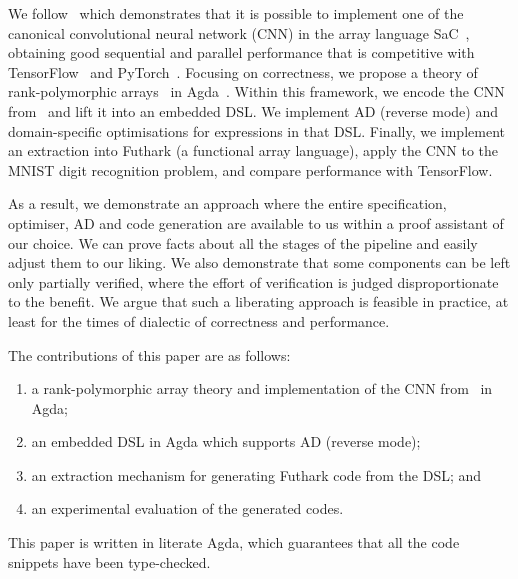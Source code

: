 We follow~\cite{cnn-array} which demonstrates that it is possible to implement
one of the canonical convolutional neural network (CNN) in the array language
SaC~\cite{sac1, sac2}, obtaining good sequential and parallel performance that
is competitive with TensorFlow~\cite{ad-tf} and PyTorch~\cite{ad-pytorch}.
Focusing on correctness, we propose a theory of rank-polymorphic
arrays~\cite{rank-poly} in Agda~\cite{agda-2-6-3}. Within this framework, we
encode the CNN from~\cite{cnn-array} and lift it into an embedded DSL. We
implement AD (reverse mode) and domain-specific optimisations for expressions in
that DSL. Finally, we implement an extraction into Futhark (a functional array
language), apply the CNN to the MNIST digit recognition problem, and compare
performance with TensorFlow.

As a result, we demonstrate an approach where the entire specification,
optimiser, AD and code generation are available to us within a proof assistant
of our choice. We can prove facts about all the stages of the pipeline and
easily adjust them to our liking. We also demonstrate that some components can
be left only partially verified, where the effort of verification is judged
disproportionate to the benefit. We argue that such a liberating approach is
feasible in practice, at least for the times of dialectic of correctness and
performance.

The contributions of this paper are as follows:
\begin{enumerate}
  \item a rank-polymorphic array theory and implementation of
        the CNN from~\cite{cnn-array} in Agda;
  \item an embedded DSL in Agda which supports AD (reverse mode);
  \item an extraction mechanism for generating Futhark code from the DSL; and
  \item an experimental evaluation of the generated codes.
\end{enumerate}

This paper is written in literate Agda, which guarantees that all the code
snippets have been type-checked.


